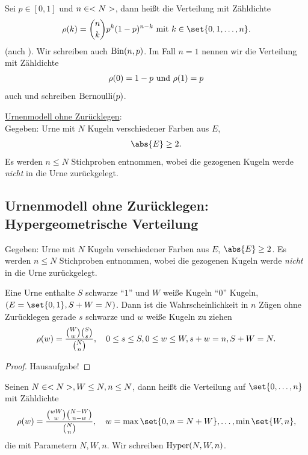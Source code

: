 \begin{definition}
	Sei $p \in [0,1]$ und $n \in <N>$, dann heißt die Verteilung mit Zähldichte
	\begin{align}
		\rho(k) = \binom{n}{k}p^k (1-p)^{n-k} \mit k \in \set{0,1,\dots,n}.\notag
	\end{align}
	 (auch ). Wir schreiben auch $\operatorname{Bin}(n,p)$. Im Fall $n = 1$ nennen wir die Verteilung mit Zähldichte
	\begin{align}
		\rho(0) = 1-p \text{ und } \rho(1) = p\notag
	\end{align}
	auch  und schreiben $\operatorname{Bernoulli}(p)$.
\end{definition}
\underline{Urnenmodell ohne Zurücklegen}: \\
Gegeben: Urne mit $N$ Kugeln verschiedener Farben aus $E$,
\begin{align}
	\abs{E} \ge 2.\notag
\end{align}
Es werden $n \le N$ Stichproben entnommen, wobei die gezogenen Kugeln werde \emph{nicht} in die Urne zurückgelegt.

\subsection{Urnenmodell ohne Zurücklegen: Hypergeometrische Verteilung}
Gegeben: Urne mit $N$ Kugeln verschiedener Farben aus $E$, $\abs{E} \ge 2$. Es werden $n \le N$ Stichproben entnommen, wobei die gezogenen Kugeln werde \emph{nicht} in die Urne zurückgelegt.
\begin{example}
	Eine Urne enthalte $S$ schwarze ``$1$'' und $W$ weiße Kugeln ``$0$'' Kugeln, $(E = \set{0,1}, S + W =N)$. Dann ist die Wahrscheinlichkeit in $n$ Zügen ohne Zurücklegen gerade $s$ schwarze und $w$ weiße Kugeln zu ziehen
	\begin{align}
		\rho(w) = \frac{\binom{W}{w}\binom{S}{s}}{\binom{N}{n}}, \quad 0 \le s \le S, 0 \le w \le W, s+w = n, S+W = N.\notag
	\end{align}
\end{example}

\begin{proof}
	Hausaufgabe! %
\end{proof}

\begin{definition}
	Seinen $N \in <N>, W \le N, n \le N$, dann heißt die Verteilung auf $\set{0,\dots,n}$ mit Zähldichte
	\begin{align}
		\rho(w) = \frac{\binom{wW}{w}\binom{N-W}{n-w}}{\binom{N}{n}}, \quad w = \max\set{0,n=N+W}, \dots, \min\set{W,n},\notag
	\end{align}
	die  mit Parametern $N,W,n$. Wir schreiben $\operatorname{Hyper}(N,W,n)$.
\end{definition}

